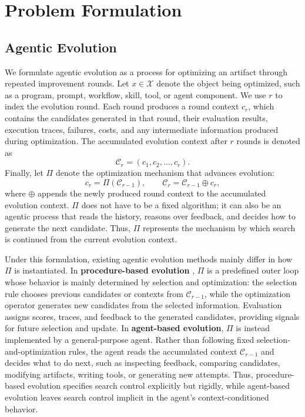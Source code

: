 \section{Problem Formulation}
\label{sec:formulation}

\subsection{Agentic Evolution}
\label{sec:agentic_evolution}

We formulate agentic evolution as a process for optimizing an artifact through repeated improvement rounds. 
Let $x \in \mathcal{X}$ denote the object being optimized, such as a program, prompt, workflow, skill, tool, or agent component. 
We use $r$ to index the evolution round. 
Each round produces a round context $c_r$, which contains the candidates generated in that round, their evaluation results, execution traces, failures, costs, and any intermediate information produced during optimization. 
The accumulated evolution context after $r$ rounds is denoted as
\[
\mathcal{C}_r = (c_1, c_2, \ldots, c_r).
\]
Finally, let $\Pi$ denote the optimization mechanism that advances evolution:
\[
c_r = \Pi(\mathcal{C}_{r-1}), 
\qquad 
\mathcal{C}_r = \mathcal{C}_{r-1} \oplus c_r,
\]
where $\oplus$ appends the newly produced round context to the accumulated evolution context. 
$\Pi$ does not have to be a fixed algorithm; it can also be an agentic process that reads the history, reasons over feedback, and decides how to generate the next candidate. 
Thus, $\Pi$ represents the mechanism by which search is continued from the current evolution context.

Under this formulation, existing agentic evolution methods mainly differ in how $\Pi$ is instantiated. 
In \textbf{procedure-based evolution }, $\Pi$ is a predefined outer loop whose behavior is mainly determined by selection and optimization: the selection rule chooses previous candidates or contexts from $\mathcal{C}_{r-1}$, while the optimization operator generates new candidates from the selected information. 
Evaluation assigns scores, traces, and feedback to the generated candidates, providing signals for future selection and update. 
In \textbf{agent-based evolution}, $\Pi$ is instead implemented by a general-purpose agent. 
Rather than following fixed selection-and-optimization rules, the agent reads the accumulated context $\mathcal{C}_{r-1}$ and decides what to do next, such as inspecting feedback, comparing candidates, modifying artifacts, writing tools, or generating new attempts. 
Thus, procedure-based evolution  specifies search control explicitly but rigidly, while agent-based evolution leaves search control implicit in the agent's context-conditioned behavior.

